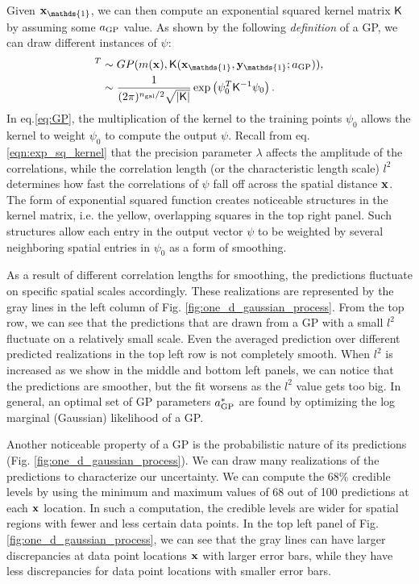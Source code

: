 Given $\xv_\mathds{1}$, we can then compute an exponential squared kernel matrix $\mathsf{K}$ 
by assuming some $a_{\rm GP}$ value.
As shown by the following {\it definition} of a GP, we can draw different instances of
$\psi$: 
\begin{align}
	[\psi_1, \psi_2, \ldots, \psi_m ]^T &\sim GP(m(\xv),
	\kerngp(\xv_{\mathds{1}}, \yv_{\mathds{1}}; \gpparams)),\\
	&\sim \frac{1}{ (2\pi)^{\ngal / 2}\sqrt{ |\kerngp|}}
	\exp\left( \psi_0^T \kerngp^{-1} \psi_0 \right).\label{eq:GP}
\end{align}
In eq.\ref{eq:GP}, the multiplication of the kernel to
the training points $\psi_0$ allows the kernel to weight $\psi_0$ to compute
the output $\psi$. 
Recall from eq. \ref{eqn:exp_sq_kernel} that 
the precision parameter $\lambda$ affects the 
amplitude of the correlations, while the correlation length (or
the characteristic length scale) $l^2$ 
determines how fast the correlations of  $\psi$ 
fall off across the spatial distance $\mathbf{x}$. 
The form of exponential squared function creates noticeable structures in the
kernel matrix, i.e. the yellow,
overlapping squares in the top right panel. 
Such structures allow each entry in the output vector $\psi$ to be weighted by
several neighboring spatial entries in $\psi_0$ as a form of smoothing.

As a result of different correlation lengths for smoothing, 
the predictions fluctuate on specific spatial scales accordingly.
These realizations are represented by the gray lines in the left column of Fig.
\ref{fig:one_d_gaussian_process}. From the top row, we can see that 
the predictions that are drawn from a GP with a small $l^2$ 
fluctuate on a relatively small scale. Even the averaged prediction over
different predicted realizations in the top
left row is not completely smooth. When $l^2$ is increased as we show in the
middle and bottom left panels, we can notice that the predictions are
smoother, but the fit worsens as the $l^2$ value gets too big. In general,  
an optimal set of GP parameters $a_{\rm GP}^*$ are found by optimizing the log
marginal (Gaussian) likelihood of a GP.

Another noticeable property of a GP is the probabilistic nature of its predictions
(Fig. \ref{fig:one_d_gaussian_process}).
We can draw many realizations of the predictions to characterize our uncertainty. 
We can compute the 68\% credible levels
by using the minimum and maximum values of 68 out of 100 predictions at each
$\mathbf{x}$ location.
In such a computation, the credible levels are wider for spatial regions 
with fewer and less certain data points. In the top left panel of Fig.
\ref{fig:one_d_gaussian_process}, we can see that the gray lines can have
larger discrepancies at data point locations $\mathbf{x}$ with larger error bars, while they
have less discrepancies for data point locations with smaller error bars.

